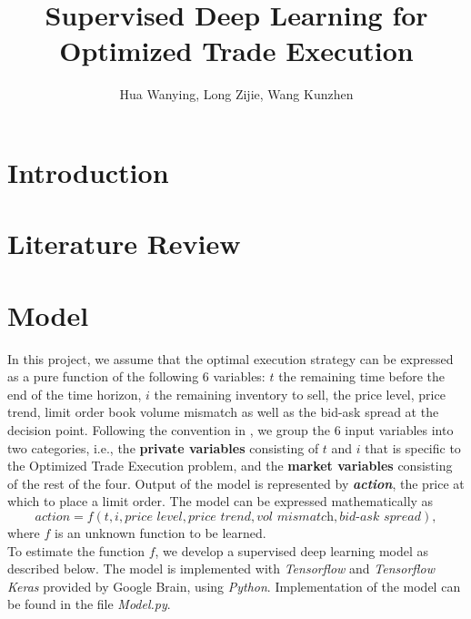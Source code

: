 \documentclass[12pt]{extarticle}
\title{Supervised Deep Learning for Optimized Trade Execution}
\author{Hua Wanying, Long Zijie, Wang Kunzhen}
\begin{document}
\maketitle

\section{Introduction}

\section{Literature Review}

\section{Model}
In this project, we assume that the optimal execution strategy can be expressed as
a pure function of the following 6 variables: $t$ the remaining time before the end of
the time horizon, $i$ the remaining inventory to sell, the price level, price trend,
limit order book volume mismatch as well as the bid-ask spread at the decision point.
Following the convention in \cite{reinforcement}, we group the 6 input variables
into two categories, i.e., the \textbf{private variables} consisting of $t$ and $i$
that is specific to the Optimized Trade Execution problem, and the \textbf{market variables}
consisting of the rest of the four. Output of the model is represented by \textit{\textbf{action}},
the price at which to place a limit order.
The model can be expressed mathematically as
$$ \textit{action} = f(t, i, \textit{price level}, \textit{price trend}, \textit{vol mismatch}, \textit{bid-ask spread}), $$
where $f$ is an unknown function to be learned. \\


\noindent To estimate the function $f$, we develop a supervised deep learning model as described below.
The model is implemented with \textit{Tensorflow} and \textit{Tensorflow
Keras} provided by Google Brain, using \textit{Python}.
Implementation of the model can be found in the file \textit{Model.py}.
\end{document}
